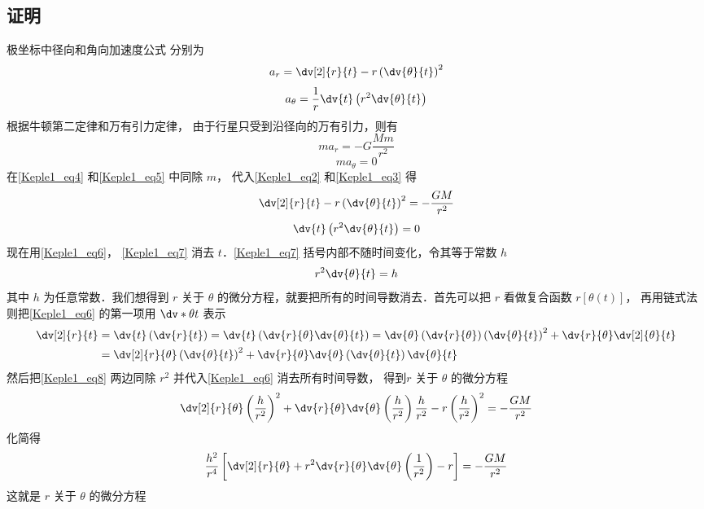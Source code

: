 \subsection{证明}
极坐标中径向和角向加速度公式%
分别为
\begin{equation}\label{Keple1_eq2}
a_r = \dv[2]{r}{t} - r \left( \dv{\theta}{t} \right)^2
\end{equation}
\begin{equation}\label{Keple1_eq3}
a_\theta = \frac{1}{r} \dv{t}\left(r^2\dv{\theta}{t} \right)
\end{equation}
根据牛顿第二定律和万有引力定律，%
由于行星只受到沿径向的万有引力，则有
\begin{equation}\label{Keple1_eq4}
m{a_r} =  - G\frac{Mm}{r^2}
\end{equation}
\begin{equation}\label{Keple1_eq5}
m{a_\theta } = 0
\end{equation}
在\autoref{Keple1_eq4} 和\autoref{Keple1_eq5} 中同除 $m$，  代入\autoref{Keple1_eq2} 和\autoref{Keple1_eq3} 得
\begin{equation}\label{Keple1_eq6}
\dv[2]{r}{t} - r \left( \dv{\theta}{t} \right)^2 =  - \frac{{GM}}{{{r^2}}}
\end{equation}
\begin{equation}\label{Keple1_eq7}
\dv{t}\left( {r^2}\dv{\theta}{t} \right) = 0
\end{equation}
现在用\autoref{Keple1_eq6}， \autoref{Keple1_eq7} 消去 $t$．\autoref{Keple1_eq7} 括号内部不随时间变化，令其等于常数 $h$
\begin{equation}\label{Keple1_eq8}
{r^2}\dv{\theta}{t} = h
\end{equation}
其中 $h$ 为任意常数．我们想得到 $r$ 关于 $\theta$ 的微分方程，就要把所有的时间导数消去．首先可以把 $r$ 看做复合函数 $r[\theta(t)]$， 再用链式法则把\autoref{Keple1_eq6} 的第一项用 $\dv*{\theta}{t}$ 表示
\begin{equation}\label{Keple1_eq10}
\begin{aligned}
\dv[2]{r}{t} & = \dv{t} \left(\dv{r}{t}\right) = \dv{t} \left( \dv{r}{\theta} \dv{\theta}{t} \right) = \dv{\theta}\left( \dv{r}{\theta} \right) \left( \dv{\theta}{t} \right)^2 + \dv{r}{\theta}\dv[2]{\theta}{t}\\
& = \dv[2]{r}{\theta} \left( \dv{\theta}{t} \right)^2 + \dv{r}{\theta}\dv{\theta}\left( \dv{\theta}{t} \right)\dv{\theta}{t}
\end{aligned}
\end{equation}
然后把\autoref{Keple1_eq8} 两边同除 $r^2$ 并代入\autoref{Keple1_eq6} 消去所有时间导数，
得到$r$ 关于 $\theta$ 的微分方程
\begin{equation}
\dv[2]{r}{\theta} \left( \frac{h}{{{r^2}}} \right)^2 + \dv{r}{\theta}\dv{\theta}\left( \frac{h}{{{r^2}}} \right)\frac{h}{{{r^2}}} - r\left( {\frac{h}{{{r^2}}}} \right)^2 =  - \frac{{GM}}{{{r^2}}}
\end{equation}
化简得
\begin{equation}\label{Keple1_eq12}
\frac{{{h^2}}}{{{r^4}}}\left[ \dv[2]{r}{\theta} + r^2\dv{r}{\theta}\dv{\theta}\left( \frac{1}{{{r^2}}} \right) - r \right] =  - \frac{{GM}}{{{r^2}}}
\end{equation}
这就是 $r$ 关于 $\theta $ 的微分方程

